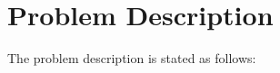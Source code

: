 %
%
%


\section{Problem Description}\label{probdesc}
The problem description \cite{1dv607:workshop1-instructions} is stated as
follows:

